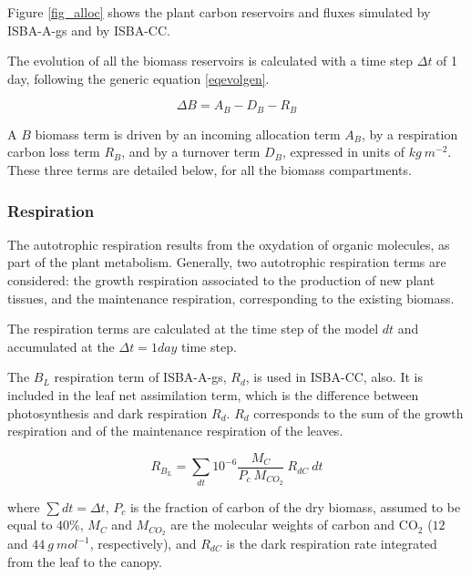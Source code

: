 {Figure \ref{fig_alloc} shows the plant carbon reservoirs and fluxes simulated by ISBA-A-gs and by ISBA-CC.

The evolution of all the biomass reservoirs is calculated with a time step 
$\Delta t$ of 1 day, following the generic equation \ref{eqevolgen}.

\begin{equation}
\Delta B = A_B - D_B - R_B 
\label{eqevolgen}
\end{equation}

A $B$ biomass term is driven by an incoming allocation term $A_B$, by a respiration carbon loss term $R_B$, 
and by a turnover term $D_B$, expressed in units of $kg \: m^{-2}$. 
These three terms are detailed below, for all the biomass compartments.


\subsubsection{Respiration}

The autotrophic respiration results from the oxydation of organic molecules, as part of the plant metabolism. 
Generally, two autotrophic respiration terms are considered: 
the growth respiration associated to the production of new plant tissues, and the maintenance respiration, 
corresponding to the existing biomass.

The respiration terms are calculated at the time step of the model $dt$ and accumulated at the 
$\Delta t = 1 day$ time step.


The $B_L$ respiration term of ISBA-A-gs, $R_d$, is used in ISBA-CC, also. 
It is included in the leaf net assimilation term, which is the difference between photosynthesis and 
dark respiration $R_d$. 
$R_d$ corresponds to the sum of the growth respiration and of the maintenance respiration of the leaves. 

\begin{equation}
R_{B_L} = \sum_{dt} 10^{-6} \frac{M_C}{P_c\:M_{CO_2}} \: R_{dC} \: dt
\end{equation}

where $\sum dt = \Delta t$, $P_c$ is the fraction of carbon of the dry biomass, 
assumed to be equal to $40\%$, $M_C$ and $M_{CO_2}$ are the molecular weights of carbon and 
CO$_2$ ($12$ and $44\: g \:mol^{-1}$, respectively), and $R_{dC}$ is the dark respiration rate 
integrated from the leaf to the canopy.

}
